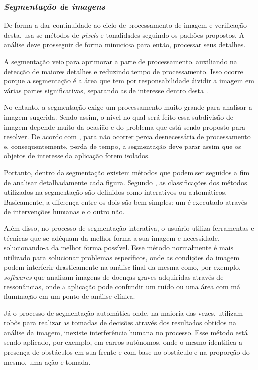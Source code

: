 \subsubsection{\textit{Segmentação de imagens}}

De forma a dar continuidade ao ciclo de processamento de imagem e verificação desta, usa-se métodos de \textit{pixels} e tonalidades seguindo os padrões propostos. A análise deve prosseguir de forma minuciosa para então, processar seus detalhes.

A segmentação veio para aprimorar a parte de processamento, auxiliando na detecção de maiores detalhes e reduzindo tempo de processamento. Isso ocorre porque a segmentação é a área que tem por responsabilidade dividir a imagem em várias partes significativas, separando as de interesse dentro desta \cite{FILHO1999}.

No entanto, a segmentação exige um processamento muito grande para analisar a imagem sugerida. Sendo assim, o nível no qual será feito essa subdivisão de imagem depende muito da ocasião e do problema que está sendo proposto para resolver. De acordo com , para não ocorrer perca desnecessária de processamento e, consequentemente, perda de tempo, a segmentação deve parar assim que os objetos de interesse da aplicação forem isolados.

Portanto, dentro da segmentação existem métodos que podem ser seguidos a fim de analisar detalhadamente cada figura. Segundo , as classificações dos métodos utilizados na segmentação são definidos como interativos ou automáticos. Basicamente, a diferença entre os dois são bem simples: um é executado através de intervenções humanas e o outro não.

Além disso, no processo de segmentação interativa, o usuário utiliza ferramentas e técnicas que se adéquam da melhor forma a sua imagem e necessidade, solucionando-a da melhor forma possível. Esse método normalmente é mais utilizado para solucionar problemas específicos, onde as condições da imagem podem interferir drasticamente na análise final da mesma como, por exemplo, \textit{softwares} que analisam imagens de doenças graves adquiridas através de ressonâncias, onde a aplicação pode confundir um ruído ou uma área com má iluminação em um ponto de análise clínica.

Já o processo de segmentação automática onde, na maioria das vezes, utilizam robôs para realizar as tomadas de decisões através dos resultados obtidos na análise da imagem, inexiste interferência humana no processo. Esse método está sendo aplicado, por exemplo, em carros autônomos, onde o mesmo identifica a presença de obstáculos em sua frente e com base no obstáculo e na proporção do mesmo, uma ação e tomada.

